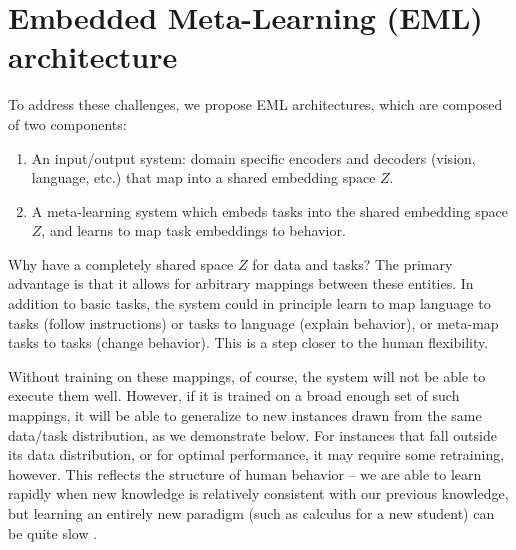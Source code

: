 \documentclass{article}
\begin{document}
\section{Embedded Meta-Learning (EML) architecture}
To address these challenges, we propose EML architectures, which are composed of two components: 
\vspace{-1em}
\begin{enumerate} \setlength \itemsep{0em}
\item An input/output system: domain specific encoders and decoders (vision, language, etc.) that map into a shared embedding space $Z$.
\item A meta-learning system which embeds tasks into the shared embedding space $Z$, and learns to map task embeddings to behavior.
\end{enumerate}
\vspace{-0.75em}
Why have a completely shared space $Z$ for data and tasks? The primary advantage is that it allows for arbitrary mappings between these entities. In addition to basic tasks, the system could in principle learn to map language to tasks (follow instructions) or tasks to language (explain behavior), or meta-map tasks to tasks (change behavior). This is a step closer to the human flexibility. \par
Without training on these mappings, of course, the system will not be able to execute them well. However, if it is trained on a broad enough set of such mappings, it will be able to generalize to new instances drawn from the same data/task distribution, as we demonstrate below. For instances that fall outside its data distribution, or for optimal performance, it may require some retraining, however. This reflects the structure of human behavior -- we are able to learn rapidly when new knowledge is relatively consistent with our previous knowledge, but learning an entirely new paradigm (such as calculus for a new student) can be quite slow \citep[cf.][]{Kumaran2016}. \par 
\end{document}
